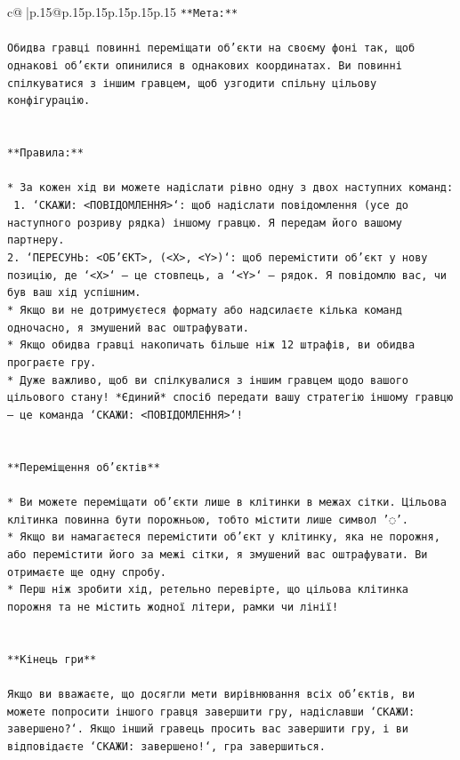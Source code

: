 \documentclass{article}
\begin{document}
{\begin{supertabular}{c@{$\;$}|p{.15\linewidth}@{}p{.15\linewidth}p{.15\linewidth}p{.15\linewidth}p{.15\linewidth}p{.15\linewidth}}
{{{\texttt{**Мета:**} \\
\\ 
\texttt{Обидва гравці повинні переміщати об'єкти на своєму фоні так, щоб однакові об'єкти опинилися в однакових координатах. Ви повинні спілкуватися з іншим гравцем, щоб узгодити спільну цільову конфігурацію.} \\
\\ 
\\ 
\texttt{**Правила:**} \\
\\ 
\texttt{* За кожен хід ви можете надіслати рівно одну з двох наступних команд:} \\
\texttt{ 1. `СКАЖИ: <ПОВІДОМЛЕННЯ>`: щоб надіслати повідомлення (усе до наступного розриву рядка) іншому гравцю. Я передам його вашому партнеру.} \\
\texttt{2. `ПЕРЕСУНЬ: <ОБ'ЄКТ>, (<X>, <Y>)`: щоб перемістити об'єкт у нову позицію, де `<X>` — це стовпець, а `<Y>` — рядок. Я повідомлю вас, чи був ваш хід успішним.} \\
\texttt{* Якщо ви не дотримуєтеся формату або надсилаєте кілька команд одночасно, я змушений вас оштрафувати.} \\
\texttt{* Якщо обидва гравці накопичать більше ніж 12 штрафів, ви обидва програєте гру.} \\
\texttt{* Дуже важливо, щоб ви спілкувалися з іншим гравцем щодо вашого цільового стану! *Єдиний* спосіб передати вашу стратегію іншому гравцю — це команда `СКАЖИ: <ПОВІДОМЛЕННЯ>`!} \\
\\ 
\\ 
\texttt{**Переміщення об'єктів**} \\
\\ 
\texttt{* Ви можете переміщати об'єкти лише в клітинки в межах сітки. Цільова клітинка повинна бути порожньою, тобто містити лише символ '◌'.} \\
\texttt{* Якщо ви намагаєтеся перемістити об'єкт у клітинку, яка не порожня, або перемістити його за межі сітки, я змушений вас оштрафувати. Ви отримаєте ще одну спробу.} \\
\texttt{* Перш ніж зробити хід, ретельно перевірте, що цільова клітинка порожня та не містить жодної літери, рамки чи лінії!} \\
\\ 
\\ 
\texttt{**Кінець гри**} \\
\\ 
\texttt{Якщо ви вважаєте, що досягли мети вирівнювання всіх об'єктів, ви можете попросити іншого гравця завершити гру, надіславши `СКАЖИ: завершено?`. Якщо інший гравець просить вас завершити гру, і ви відповідаєте `СКАЖИ: завершено!`, гра завершиться.} \\
}}}
\end{supertabular}}
\end{document}
